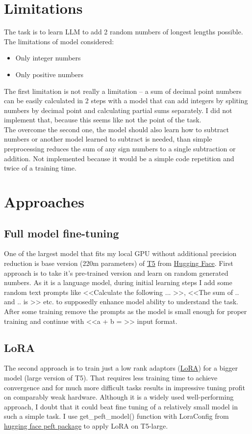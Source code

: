 \documentclass[a4paper,12pt]{article}
\begin{document}
	
	\section{Limitations}
	The task is to learn LLM to add 2 random numbers of longest lengths possible. The limitations of model considered:
		\begin{itemize}
			\item Only integer numbers
			\item Only positive numbers
		\end{itemize}
		The first limitation is not really a limitation -- a sum of decimal point numbers can be easily calculated in 2 steps with a model that can add integers by spliting numbers by decimal point and calculating partial sums separately. I did not implement that, because this seems like not the point of the task.\\
		The overcome the second one, the model should also learn how to subtract numbers or another model learned to subtract is needed, than simple preprocessing reduces the sum of any sign numbers to a single subtraction or addition. Not implemented because it would be a simple code repetition and twice of a training time.
	
	\section{Approaches}
		\subsection{Full model fine-tuning}
			One of the largest model that fits my local GPU without additional precision reduction is base version (220m parameters) of \href{https://arxiv.org/abs/1910.10683}{T5} from \href{https://huggingface.co/}{Hugging Face}. First approach is to take it's pre-trained version and learn on random generated numbers. As it is a language model, during initial learning steps I add some random text prompts like <<Calculate the following ... >>, <<The sum of .. and .. is >> etc. to supposedly enhance model ability to understand the task. After some training remove the prompts as the model is small enough for proper training and continue with <<a + b = >> input format.
		
		\subsection{LoRA}
			The second approach is to train just a low rank adaptors (\href{https://arxiv.org/abs/2106.09685}{LoRA}) for a bigger model (large version of T5). That requires less training time to achieve convergence and for much more difficult tasks results in impressive tuning profit on comparably weak hardware. Although it is a widely used well-performing approach, I doubt that it could beat fine tuning of a relatively small model in such a simple task. I use get\_peft\_model() function with LoraConfig from \href{https://huggingface.co/docs/peft/main/en/package_reference/tuners#peft.PromptEncoderConfig}{hugging face peft package} to apply LoRA on T5-large. 
		
\end{document}
